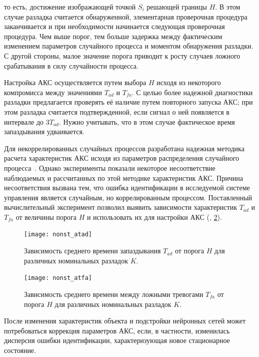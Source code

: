 \noindent то есть, достижение изображающей точкой $S_i$ решающей
границы $H$.  В этом случае разладка считается обнаруженной,
элементарная проверочная процедура заканчивается и при необходимости
начинается следующая проверочная процедура.  Чем выше порог, тем
больше задержка между фактическим изменением параметров случайного
процесса и моментом обнаружения разладки.  С другой стороны, малое
значение порога приводит к росту случаев ложного срабатывания в силу
случайности процесса.

Настройка АКС осуществляется путем выбора $H$ исходя из некоторого
компромисса между значениями $T_{ad}$ и $T_{fa}$.  С целью более
надежной диагностики разладки предлагается проверять её наличие путем
повторного запуска АКС; при этом разладка считается подтвержденной,
если сигнал о ней появляется в интервале до $3T_{ad}$.  Нужно
учитывать, что в этом случае фактическое время запаздывания
удваивается.

Для некоррелированных случайных процессов разработана надежная
методика расчета характеристик АКС исходя из параметров распределения
случайного процесса~\cite{filatov83,filfil-iwk1982}.  Однако
эксперименты показали некоторое несоответствие наблюдаемых и
рассчитанных по этой методике характеристик АКС.  Причина
несоответствия вызвана тем, что ошибка идентификации в исследуемой
системе управления является случайным, но коррелированным процессом.
Поставленный вычислительный эксперимент позволил выявить зависимости
характеристик $T_{ad}$ и $T_{fa}$ от величины порога $H$ и
использовать их для настройки АКС (,
\ref{fig:nonst_atfa}).

\begin{figure}[h]
\centering
\texttt{[image: nonst\_atad]}
\caption{Зависимость среднего времени запаздывания $T_{ad}$ от порога
  $H$ для различных номинальных разладок $K$.}
\label{fig:nonst_atad}
\end{figure}

\begin{figure}[h]
\centering
\texttt{[image: nonst\_atfa]}
\caption{Зависимость среднего времени между ложными тревогами $T_{fa}$
  от порога $H$ для различных номинальных разладок $K$.}
\label{fig:nonst_atfa}
\end{figure}

После изменения характеристик объекта и подстройки нейронных сетей
может потребоваться коррекция параметров АКС, если, в частности,
изменилась дисперсия ошибки идентификации, характеризующая новое
стационарное состояние.

